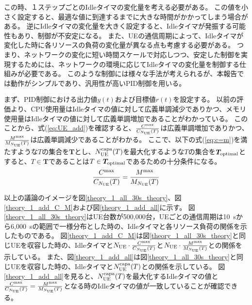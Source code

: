 \documentclass[a4j]{ujarticle}
\begin{document}
この時、１ステップごとのIdleタイマの変化量を考える必要がある。
この値を小さく設定すると、最適な値に到達するまでに大きな時間がかかってしまう場合がある。
逆にIdleタイマの変化量を大きく設定すると、Idleタイマが発振する可能性もあり、制御が不安定になる。
また、UEの通信周期によって、Idleタイマが変化した時に各リソースの負荷の変化量が異なる点も考慮する必要がある。
つまり、ネットワークの変化に短い時間スケールで対応しつつ、安定した制御を実現するためには、ネットワークの環境に応じてIdleタイマの変化量を制御する仕組みが必要である。
このような制御には様々な手法が考えられるが、本報告では動作がシンプルであり、汎用性が高いPID制御を用いる。


まず、PID制御における出力値$y(t)$および目標値$r(t)$を設定する。
以前の評価より、CPU使用量はIdleタイマの値に対して広義単調減少でありかつ、メモリ使用量はIdleタイマの値に対して広義単調増加であることがわかっている。
このことから、式(\ref{eq:UE_add})を確認すると、$\frac{C^{\rm max}}{C_{N_{\rm UE}}(T)}$は広義単調増加でありかつ、$\frac{M^{\rm max}}{M_{N_{\rm UE}}(T)}$は広義単調減少であることがわかる。
ここで、以下の式(\ref{eq:c=m})を満たすような$T$の集合を$\bm{T}$とし、$N_{\rm UE}^{\rm capa}(T)$を最大化するような$T$の集合を$\bm{T}_{\rm optimal}$とすると、$T\in\bm{T}$であることは$T\in\bm{T}_{\rm optimal}$であるための十分条件になる。
\begin{eqnarray}
\frac{C^{\rm max}}{C_{N_{\rm UE}}(T)}=\frac{M^{\rm max}}{M_{N_{\rm UE}}(T)}
  \label{eq:c=m}
\end{eqnarray}


以上の議論のイメージを図\ref{theory_1_all_30s_theory}、図\ref{theory_1_add_C_M}および図\ref{theory_1_add_all}に示す。
図\ref{theory_1_all_30s_theory}はUE台数が500,000台，UEごとの通信周期は10~sから6,000~sの範囲で一様分布とした時の、Idleタイマと各リソース負荷の関係を示したものである。
図\ref{theory_1_add_C_M}は図\ref{theory_1_all_30s_theory}と同じUEを収容した時の、Idleタイマと$N_{\rm UE} \cdot \frac{C^{\rm max}}{C_{N_{\rm UE}}(T)}$と$N_{\rm UE} \cdot \frac{M^{\rm max}}{M_{N_{\rm UE}}(T)}$との関係を示している。
また、図\ref{theory_1_add_all}は図\ref{theory_1_all_30s_theory}と同じUEを収容した時の、Idleタイマと$N_{\rm UE}^{\rm capa}(T)$との関係を示している。
図\ref{theory_1_add_all}を見ると、$N_{\rm UE}^{\rm capa}(T)$を最大化するIdleタイマの値と$\frac{C^{\rm max}}{C_{N_{\rm UE}}(T)}=\frac{M^{\rm max}}{M_{N_{\rm UE}}(T)}$となる時のIdleタイマの値が一致していることが確認できる。
\end{document}
